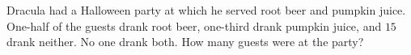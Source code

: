 Dracula had a Halloween party at which he served root beer and pumpkin juice. One-half of the guests drank root beer, one-third drank pumpkin juice, and $15$ drank neither. No one drank both. How many guests were at the party?
